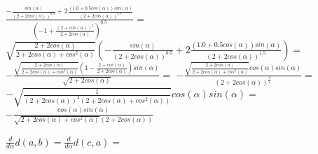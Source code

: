 \documentclass[a4paper,10pt]{article}
\begin{document}
$\frac{- \frac{sin\left(\alpha\right)}{\left(2 + 2 cos\left(\alpha\right)\right)^{0.5}} + 2 \frac{\left(1.0 + 0.5 cos\left(\alpha\right)\right) sin\left(\alpha\right)}{\left(2 + 2 cos\left(\alpha\right)\right)^{1.5}}}{\left(-1 + \frac{\left(2 + cos\left(\alpha\right)\right)^{2}}{2 + 2 cos\left(\alpha\right)}\right)^{0.5}}=$
$\sqrt{\frac{2 + 2 cos\left(\alpha\right)}{2 + 2 cos\left(\alpha\right) + cos^{2}\left(\alpha\right)}} \left(- \frac{sin\left(\alpha\right)}{\left(2 + 2 cos\left(\alpha\right)\right)^{0.5}} + 2 \frac{\left(1.0 + 0.5 cos\left(\alpha\right)\right) sin\left(\alpha\right)}{\left(2 + 2 cos\left(\alpha\right)\right)^{1.5}}\right)=$
$- \frac{\sqrt{\frac{2 + 2 cos\left(\alpha\right)}{2 + 2 cos\left(\alpha\right) + cos^{2}\left(\alpha\right)}} \left(1 - \frac{2 + cos\left(\alpha\right)}{2 + 2 cos\left(\alpha\right)}\right) sin\left(\alpha\right)}{\sqrt{2 + 2 cos\left(\alpha\right)}}=$
$- \frac{\sqrt{\frac{2 + 2 cos\left(\alpha\right)}{2 + 2 cos\left(\alpha\right) + cos^{2}\left(\alpha\right)}} cos\left(\alpha\right) sin\left(\alpha\right)}{\left(2 + 2 cos\left(\alpha\right)\right)^{\frac{3}{2}}}=$
$- \sqrt{\frac{1}{\left(2 + 2 cos\left(\alpha\right)\right)^{2} \left(2 + 2 cos\left(\alpha\right) + cos^{2}\left(\alpha\right)\right)}} cos\left(\alpha\right) sin\left(\alpha\right)=$
$- \frac{cos\left(\alpha\right) sin\left(\alpha\right)}{\sqrt{2 + 2 cos\left(\alpha\right) + cos^{2}\left(\alpha\right)} \left(2 + 2 cos\left(\alpha\right)\right)}$


$\frac{d}{d\alpha}d\left(a, b\right)=\frac{d}{d\alpha}d\left(c, a\right)=$
\end{document}
